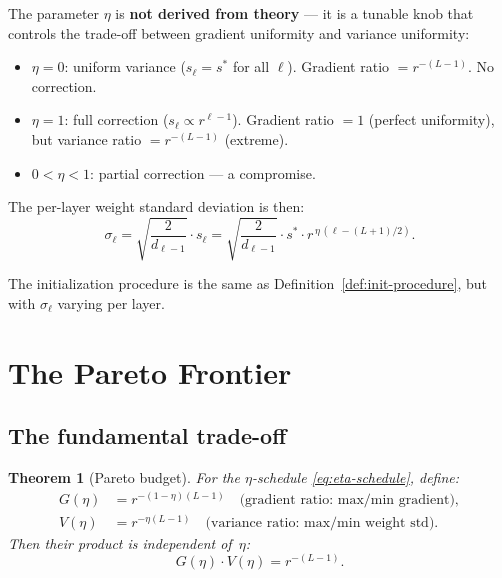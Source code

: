 \documentclass[11pt,a4paper]{article}
\newtheorem{theorem}{Theorem}[section]
\theoremstyle{definition}
\begin{document}
The parameter $\eta$ is \textbf{not derived from theory} --- it is a
tunable knob that controls the trade-off between gradient uniformity
and variance uniformity:
\begin{itemize}[nosep]
  \item $\eta = 0$: uniform variance ($s_\ell = s^{\ast}$ for all $\ell$).
        Gradient ratio $= r^{-(L-1)}$.  No correction.
  \item $\eta = 1$: full correction ($s_\ell \propto r^{\ell-1}$).
        Gradient ratio $= 1$ (perfect uniformity), but variance ratio
        $= r^{-(L-1)}$ (extreme).
  \item $0 < \eta < 1$: partial correction --- a compromise.
\end{itemize}

The per-layer weight standard deviation is then:
\begin{equation}\label{eq:target-std}
  \sigma_\ell = \sqrt{\frac{2}{d_{\ell-1}}} \cdot s_\ell
              = \sqrt{\frac{2}{d_{\ell-1}}} \cdot s^{\ast} \cdot r^{\,\eta\,(\ell - (L+1)/2)}.
\end{equation}

The initialization procedure is the same as
Definition~\ref{def:init-procedure}, but with $\sigma_\ell$
varying per layer.


\section{The Pareto Frontier}
\label{sec:pareto}

\subsection{The fundamental trade-off}

\begin{theorem}[Pareto budget]
  \label{thm:pareto}
  For the $\eta$-schedule \eqref{eq:eta-schedule}, define:
  \begin{align}
    G(\eta) &= r^{-(1-\eta)(L-1)} \quad\text{(gradient ratio: max/min gradient)}, \label{eq:grad-ratio-formula} \\
    V(\eta) &= r^{-\eta(L-1)} \quad\text{(variance ratio: max/min weight std)}.  \label{eq:var-ratio-formula}
  \end{align}
  Then their product is independent of~$\eta$:
  \begin{equation}\label{eq:pareto}
    \boxed{\;G(\eta) \cdot V(\eta) = r^{-(L-1)}.\;}
  \end{equation}
\end{theorem}
\end{document}
